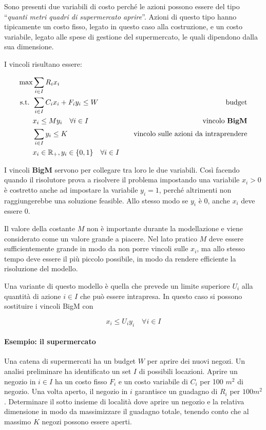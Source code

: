 Sono presenti due variabili di costo perché le azioni possono essere del tipo ``\textit{quanti metri quadri di supermercato aprire}''. Azioni di questo tipo hanno tipicamente un costo fisso, legato in questo caso alla costruzione, e un costo variabile, legato alle spese di gestione del supermercato, le quali dipendono dalla sua dimensione.

I vincoli risultano essere:

\begin{align*}
	\max &\sum\limits_{i \in I} R_i x_i \\
	\text{s.t. } &\sum\limits_{i \in I} C_i x_i + F_i y_i \leq W &\quad\text{budget} \\
	&x_i \leq M y_i  \quad \forall i \in I &\quad\text{vincolo \textbf{BigM}}  \\
	&\sum\limits_{i \in I} y_i \leq K &\quad\text{vincolo sulle azioni da intraprendere} \\
	&x_i \in \mathbb{R}_+, y_i \in \{0,1\} \quad \forall i \in I&
\end{align*}

I vincoli \textbf{BigM} servono per collegare tra loro le due variabili.
Così facendo quando il risolutore prova a risolvere il problema impostando una variabile $x_i > 0$ è costretto anche ad impostare la variabile $y_i = 1$, perché altrimenti non raggiungerebbe una soluzione feasible. Allo stesso modo se $y_i$ è 0, anche $x_i$ deve essere 0.

Il valore della costante $M$ non è importante durante la modellazione e viene considerato come un valore grande a piacere.
Nel lato pratico $M$ deve essere sufficientemente grande in modo da non porre vincoli sulle $x_i$, ma allo stesso tempo deve essere il più piccolo possibile, in modo da rendere efficiente la risoluzione del modello.

Una variante di questo modello è quella che prevede un limite superiore $U_i$ alla quantità di azione $i \in I$ che può essere intrapresa. In questo caso si possono sostituire i vincoli BigM con 

$$
x_i \leq U_i y_i \quad \forall i \in I
$$

\paragraph{Esempio: il supermercato}

Una catena di supermercati ha un budget $W$ per aprire dei nuovi negozi. Un analisi preliminare ha identificato un set $I$ di possibili locazioni.
Aprire un negozio in $i \in I$ ha un costo fisso $F_i$ e un costo variabile di $C_i$ per 100 $m^2$ di negozio.
Una volta aperto, il negozio in $i$ garantisce un guadagno di $R_i$ per $100 m^2$. Determinare il sotto insieme di località dove aprire un negozio e la relativa dimensione in modo da massimizzare il guadagno totale, tenendo conto che al massimo $K$ negozi possono essere aperti.

